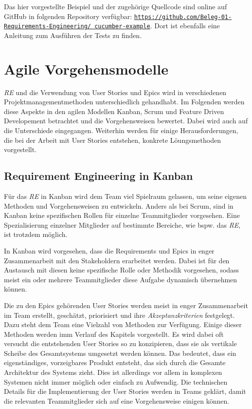 \documentclass[acmtog]{acmart}
\begin{document}
Das hier vorgestellte Beispiel und der zugehörige Quellcode sind online auf GitHub in folgenden Repository verfügbar:
\href{https://github.com/Beleg-01-Requirements-Engineering/cucumber-example}{\texttt{https://github.com/Beleg-01-Requirements-Engineering/
		cucumber-example}}.
Dort ist ebenfalls eine Anleitung zum Ausführen der Tests zu finden.


\section{Agile Vorgehensmodelle}

\emph{RE} und die Verwendung von User Stories und Epics wird in verschiedenen Projektmanagementmethoden unterschiedlich gehandhabt. Im Folgenden werden
diese Aspekte in den agilen Modellen Kanban, Scrum und Feature Driven Developement betrachtet und die Vorgehensweisen bewertet. Dabei wird auch auf die Unterschiede eingegangen.
Weiterhin werden für einige Herausforderungen, die bei der Arbeit mit User Stories entstehen, konkrete Löungsmethoden vorgestellt.

\subsection{Requirement Engineering in Kanban}

Für das \emph{RE} in Kanban wird dem Team viel Spielraum gelassen,
um seine eigenen Methoden und Vorgehensweisen zu entwickeln. Anders als bei Scrum, sind
in Kanban keine spezifischen Rollen für einzelne Teammitglieder vorgesehen. Eine
Spezialisierung einzelner Mitglieder auf bestimmte Bereiche, wie bspw. das \emph{RE}, ist trotzdem
möglich.

In Kanban wird vorgesehen, dass die Requirements und Epics in enger Zusammenarbeit mit
den Stakeholdern erarbeitet werden. Dabei ist für den Austausch mit diesen keine
spezifische Rolle oder Methodik vorgesehen, sodass meist ein oder mehrere Teammitglieder
diese Aufgabe dynamisch übernehmen können. \cite{agileprocesses}

Die zu den Epics gehörenden User Stories werden meist in enger Zusammenarbeit im Team erstellt,
geschätzt, priorisiert und ihre \emph{Akzeptanzkriterien} festgelegt. Dazu steht dem Team eine Vielzahl
von Methoden zur Verfügung. Einige dieser Methoden werden imm Verlauf des Kapitels vorgestellt.
Es wird dabei oft versucht die entstehenden User Stories so zu konzipieren, dass sie als vertikale
Scheibe des Gesamtsystems umgesetzt werden können. Das bedeutet, dass ein eigenständiges, vorzeigbares
Produkt entsteht, das sich durch die Gesamte Architektur des Systems zieht. Dies ist allerdings
vor allem in komplexen Systemen nicht immer möglich oder einfach zu Aufwendig. Die technischen Details für die Implementierung
der User Stories werden in Teams geklärt, damit die relevanten Teammitglieder sich auf eine Vorgehensweise
einigen können. \cite{agileprocesses}
\end{document}
